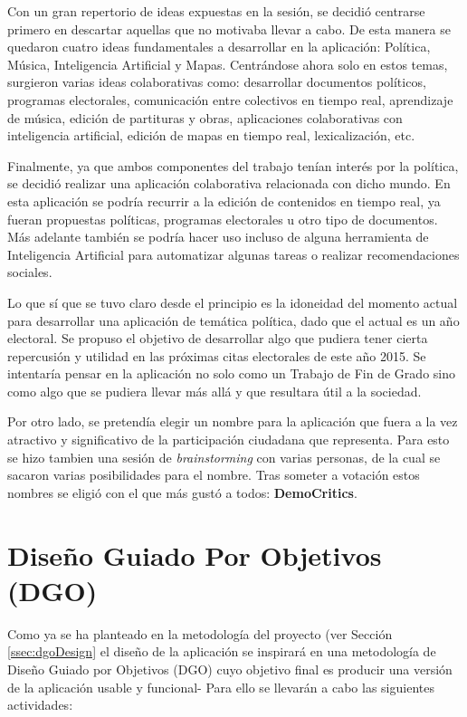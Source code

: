 Con un gran repertorio de ideas expuestas en la sesión, se decidió centrarse primero en descartar aquellas que no motivaba llevar a cabo. De esta manera se quedaron cuatro ideas fundamentales a desarrollar en la aplicación: Política, Música, Inteligencia Artificial y Mapas. Centrándose ahora solo en estos temas, surgieron varias ideas colaborativas como: desarrollar documentos políticos, programas electorales, comunicación entre colectivos en tiempo real, aprendizaje de música, edición de partituras y obras, aplicaciones colaborativas con inteligencia artificial, edición de mapas en tiempo real, lexicalización, etc.

Finalmente, ya que ambos componentes del trabajo tenían interés por la política, se decidió realizar una aplicación colaborativa relacionada con dicho mundo. En esta aplicación se podría recurrir a la edición de contenidos en tiempo real, ya fueran propuestas políticas, programas electorales u otro tipo de documentos. Más adelante también se podría hacer uso incluso de alguna herramienta de Inteligencia Artificial para automatizar algunas tareas o realizar recomendaciones sociales.

Lo que sí que se tuvo claro desde el principio es la idoneidad del momento actual para desarrollar una aplicación de temática política, dado que el actual es un año electoral. Se propuso el objetivo de desarrollar algo que pudiera tener cierta repercusión y utilidad en las próximas citas electorales de este año 2015. Se intentaría pensar en la aplicación no solo como un Trabajo de Fin de Grado sino como algo que se pudiera llevar más allá y que resultara útil a la sociedad.

Por otro lado, se pretendía elegir un nombre para la aplicación que fuera a la vez atractivo y significativo de la participación ciudadana que representa. Para esto se hizo tambien una sesión de \textit{brainstorming} con varias personas, de la cual se sacaron varias posibilidades para el nombre. Tras someter a votación estos nombres se eligió con el que más gustó a todos: \textbf{DemoCritics}.

\section{Diseño Guiado Por Objetivos (DGO)}

Como ya se ha planteado en la metodología del proyecto (ver Sección \ref{ssec:dgoDesign} el diseño de la aplicación se inspirará en una metodología de Diseño Guiado por Objetivos (DGO) cuyo objetivo final es producir una versión de la aplicación usable y funcional- Para ello se llevarán a cabo las siguientes actividades:

